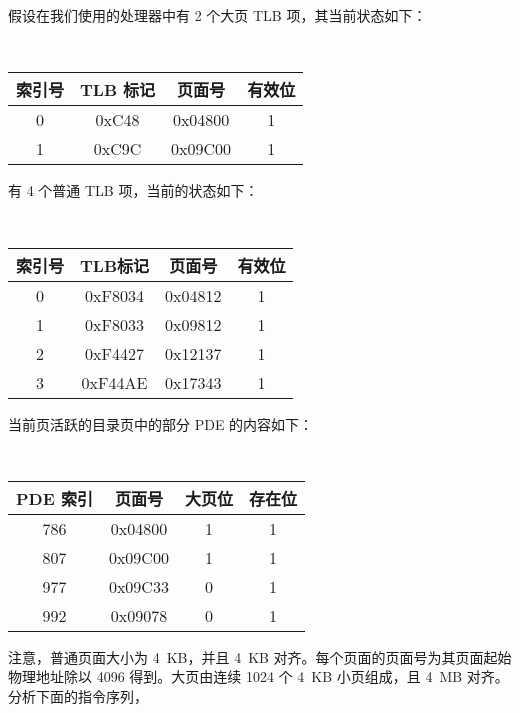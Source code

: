 \begin{problems}
        假设在我们使用的处理器中有 2 个大页 TLB 项，其当前状态如下：
        \begin{table}[H]
            \tt
            \centering
            \begin{tabular}{|c|c|c|c|}
                \hline
                索引号 & TLB 标记 & 页面号 & 有效位 \\ \hline
                0 & 0xC48 & 0x04800 & 1 \\ \hline
                1 & 0xC9C & 0x09C00 & 1 \\ \hline
            \end{tabular}
        \end{table}
        有 4 个普通 TLB 项，当前的状态如下：
        \begin{table}[H]
            \tt
            \centering
            \begin{tabular}{|c|c|c|c|}
                \hline
                索引号 & TLB标记 & 页面号 & 有效位 \\ \hline
                0 & 0xF8034 & 0x04812 & 1 \\ \hline
                1 & 0xF8033 & 0x09812 & 1 \\ \hline
                2 & 0xF4427 & 0x12137 & 1 \\ \hline
                3 & 0xF44AE & 0x17343 & 1 \\ \hline
            \end{tabular}
        \end{table}
        当前页活跃的目录页中的部分 PDE 的内容如下：
        \begin{table}[H]
            \tt
            \centering
            \begin{tabular}{|c|c|c|c|}
                \hline
                PDE 索引 & 页面号 & 大页位 & 存在位 \\ \hline
                786 & 0x04800 & 1 & 1 \\ \hline
                807 & 0x09C00 & 1 & 1 \\ \hline
                977 & 0x09C33 & 0 & 1 \\ \hline
                992 & 0x09078 & 0 & 1 \\ \hline
            \end{tabular}
        \end{table}
        注意，普通页面大小为 \SI{4}{KB}，并且 \SI{4}{KB} 对齐。每个页面的页面号为其页面起始物理地址除以 4096 得到。大页由连续 1024 个 \SI{4}{KB} 小页组成，且 \SI{4}{MB} 对齐。
        \qn 分析下面的指令序列，
        \begin{verbatim}

\end{verbatim}
\end{problems}

